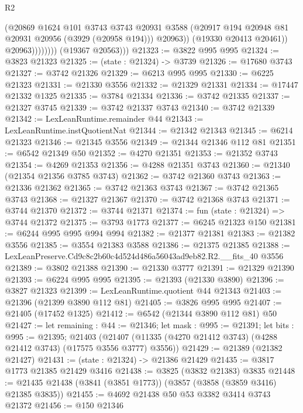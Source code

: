 \begin{lexlean}{R2}
\begin{coremodule}
                            (@20869
                              @1624
                              @101
                              @3743
                              @3743
                              @20931
                              @3588
                              (@20917 @194 @20948 @81 @20931 @20956 (@3929 (@20958 @194)))
                              @20963))
                          (@19330 @20413 @20461))
                        @20963))))))))
        (@19367 @20563)))
@21323 := @3822 @995 @995
@21324 := @3823 @21323
@21325 := (state : @21324) -> @3739
@21326 := @17680 @3743
@21327 := @3742 @21326
@21329 := @6213 @995 @995
@21330 := @6225 @21323
@21331 := @21330 @3556
@21332 := @21329 @21331
@21334 := @17447 @21332 @1325
@21335 := @3784 @21334
@21336 := @3742 @21335
@21337 := @21327 @3745
@21339 := @3742 @21337 @3743
@21340 := @3742 @21339
@21342 := LexLeanRuntime.remainder @44
@21343 := LexLeanRuntime.instQuotientNat
@21344 := @21342 @21343
@21345 := @6214 @21323
@21346 := @21345 @3556
@21349 := @21344 @21346 @112 @81
@21351 := @6542 @21349 @50
@21352 := @4270 @21351
@21353 := @21352 @3743
@21354 := @4269 @21353
@21356 := @4288 @21351 @3743
@21360 := @21340 (@21354 @21356 @3785 @3743)
@21362 := @3742 @21360 @3743
@21363 := @21336 @21362
@21365 := @3742 @21363 @3743
@21367 := @3742 @21365 @3743
@21368 := @21327 @21367
@21370 := @3742 @21368 @3743
@21371 := @3744 @21370
@21372 := @3744 @21371
@21374 := fun (state : @21324) => @3744 @21372
@21375 := @3793 @1773
@21377 := @6245 @21323 @150
@21381 := @6244 @995 @995 @994 @994
@21382 := @21377 @21381
@21383 := @21382 @3556
@21385 := @3554 @21383 @3588
@21386 := @21375 @21385
@21388 := LexLeanPreserve.Cd9c8c2b60c4d524d486a56043ad9eb82.R2.__fits_40 @3556
@21389 := @3802 @21388
@21390 := @21330 @3777
@21391 := @21329 @21390
@21393 := @6224 @995 @995
@21395 := @21393 (@21330 @3890)
@21396 := @3827 @21323
@21399 := LexLeanRuntime.quotient @44 @21343
@21403 := @21396 (@21399 @3890 @112 @81)
@21405 := @3826 @995 @995
@21407 := @21405 (@17452 @1325)
@21412 := @6542 (@21344 @3890 @112 @81) @50
@21427 := let remaining : @44 := @21346;
  let mask : @995 := @21391;
  let bits : @995 := @21395;
  @21403 (@21407 (@11335 (@4270 @21412 @3743) (@4288 @21412 @3743) (@17575 @3556 @3777) @3556))
@21429 := @21389 (@21382 @21427)
@21431 := (state : @21324) -> @21386 @21429
@21435 := @3817 @1773 @21385 @21429 @3416
@21438 := @3825 (@3832 @21383) @3835
@21448 := @21435 @21438 (@3841 (@3851 @1773)) (@3857 (@3858 (@3859 @3416) @21385 @3835))
@21455 := @4692 @21438 @50 @53 @3382 @3414 @3743 @21372
@21456 := @150 @21346

\end{coremodule}
\end{lexlean}

